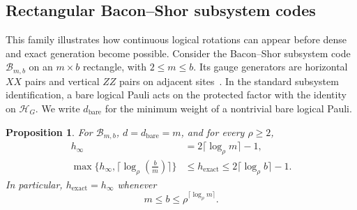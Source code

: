 \documentclass[aps,prl,reprint,longbibliography,nofootinbib,nobibnotes]{revtex4-2}
\newtheorem{proposition}{Proposition}
\newcommand{\HH}{\mathcal H}
\begin{document}
\subsection*{Rectangular Bacon--Shor subsystem codes}
\label{sm:bacon-shor}

This family illustrates how continuous logical rotations can appear before dense and exact
generation become possible. Consider the Bacon--Shor subsystem code $\mathcal B_{m,b}$ on an
$m\times b$ rectangle, with $2\le m\le b$. Its gauge generators are horizontal $XX$ pairs and
vertical $ZZ$ pairs on adjacent sites~\cite{Bacon,BaconCasaccino}. In the standard subsystem
identification, a bare logical Pauli acts on the protected factor with the identity on $\HH_G$. We
write $d_{\mathrm{bare}}$ for the minimum weight of a nontrivial bare logical Pauli.

\begin{proposition}\label{prop:bacon-shor-saturation}
For $\mathcal B_{m,b}$, $d=d_{\mathrm{bare}}=m$, and for every $\rho\ge2$,
\begin{align}
 h_\infty &= 2\lceil\log_\rho m\rceil-1,
 \label{eq:bacon-shor-onset}\\
 \max\{h_\infty,\lceil\log_\rho(\frac{b}{m})\rceil\}
 &\le h_{\mathrm{exact}}
 \le 2\lceil\log_\rho b\rceil-1.
 \label{eq:bacon-shor-exact-bounds}
\end{align}
In particular, $h_{\mathrm{exact}}=h_\infty$ whenever
\begin{equation}\label{eq:bacon-shor-saturation}
 m\le b\le \rho^{\lceil\log_\rho m\rceil}.
\end{equation}
\end{proposition}
\end{document}
